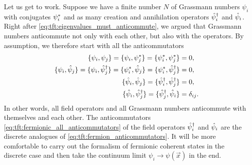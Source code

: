 Let us get to work.
Suppose we have a finite number $N$ of Grassmann numbers $\psi_i$ with conjugates ${\psi}^*_i$ and as many creation and annihilation operators $\hat\psi^\dagger_i$ and $\hat\psi_i$.
Right after \cref{eq:tft:eigenvalues_must_anticommute}, we argued that Grassmann numbers anticommute not only with each other, but also with the operators.
By assumption, we therefore start with all the anticommutators
\begin{subequations}%
\begin{align}%
	\acomm{\psi_i}{\psi_j} = \acomm{\psi_i}{\conj\psi_j} = \acomm{\conj\psi_i}{\conj\psi_j}                             &= 0            , \label{eq:tft:fermionic_anticommutator_gnums} \\
	\acomm{\psi_i}{\destr_j} = \acomm{\psi_i}{\creat_j} = \acomm{\conj\psi_i}{\destr_j} = \acomm{\conj\psi_i}{\creat_j} &= 0            , \label{eq:tft:fermionic_anticommutator_gnum_op} \\
	\acomm{\destr_i}{\destr_j} = \acomm{\creat_i}{\creat_j}                                                             &= 0            , \label{eq:tft:fermionic_anticommutator_sameops} \\
	\acomm{\destr_i}{\creat_j} = \acomm{\creat_j}{\destr_i}                                                             &= \delta_{i j} . \label{eq:tft:fermionic_anticommutator_diffops}
\end{align}%
\label{eq:tft:fermionic_all_anticommutators}
\end{subequations}%
In other words, all field operators and all Grassmann numbers anticommute with themselves and each other.
The anticommutators \eqref{eq:tft:fermionic_all_anticommutators} of the field operators $\hat\psi^\dagger_i$ and $\hat\psi_i$ are the discrete analogues of \eqref{eq:tft:fermion_anticommutators}.
It will be more comfortable to carry out the formalism of fermionic coherent states in the discrete case and then take the continuum limit $\psi_i \rightarrow \psi(\vec{x})$ in the end.

